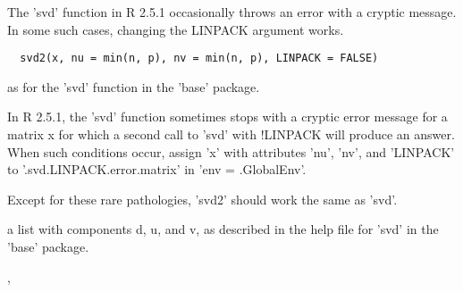 \begin{Description}\relax
The 'svd' function in R 2.5.1 occasionally throws an error
with a cryptic message.  In some such cases, changing the
LINPACK argument works.
\end{Description}
\begin{Usage}
\begin{verbatim}
  svd2(x, nu = min(n, p), nv = min(n, p), LINPACK = FALSE)
\end{verbatim}
\end{Usage}
\begin{Arguments}
\begin{ldescription}
\item[\code{x, nu, nv, LINPACK}] as for the 'svd' function in the 'base' package.

\end{ldescription}
\end{Arguments}
\begin{Details}\relax
In R 2.5.1, the 'svd' function sometimes stops with a cryptic error
message for a matrix x for which a second call to 'svd' with !LINPACK
will produce an answer.  When such conditions occur, assign 'x' with
attributes 'nu', 'nv', and 'LINPACK' to '.svd.LINPACK.error.matrix'
in 'env = .GlobalEnv'.

Except for these rare pathologies, 'svd2' should work the same as
'svd'.
\end{Details}
\begin{Value}
a list with components d, u, and v, as described in the help file for
'svd' in the 'base' package.
\end{Value}
\begin{SeeAlso}\relax
{},
\end{SeeAlso}

